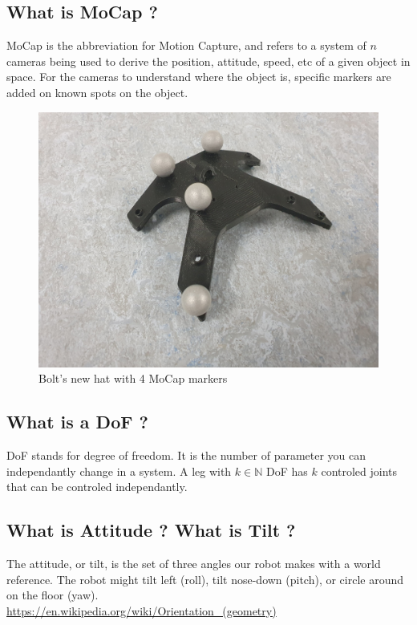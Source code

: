 \documentclass[a4paper,10pt]{article}
\begin{document}
\subsection{What is MoCap ?}
MoCap is the abbreviation for Motion Capture, and refers to a system of $n$ cameras being used to derive the position, attitude, speed, etc of a given object in space. For the cameras to understand where the object is, specific markers are added on known spots on the object.
\begin{figure}[h]
\centering
  \includegraphics[width=\linewidth, angle=0, scale=0.2]{./images/Bolt_hat.jpg}
  \caption{Bolt's new hat with 4 MoCap markers}
\end{figure}

\subsection{What is a DoF ?}
DoF stands for degree of freedom. It is the number of parameter you can independantly change in a system. A leg with $k \in \mathbb{N}$ DoF has $k$ controled joints that can be controled independantly.


\subsection{What is Attitude ? What is Tilt ?}
The attitude, or tilt, is the set of three angles our robot makes with a world reference. The robot might tilt left (roll), tilt nose-down (pitch), or circle around on the floor (yaw).\\
 \url{https://en.wikipedia.org/wiki/Orientation_(geometry)}
 
\end{document}
